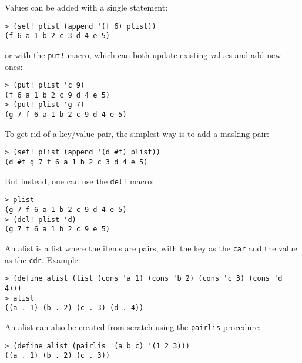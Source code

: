 \documentclass{report}
\begin{document}
{Values can be added with a single statement:

\noindent\makebox[\linewidth]{\rule{\linewidth}{0.4pt}}
\begin{lstlisting}
> (set! plist (append '(f 6) plist))
(f 6 a 1 b 2 c 3 d 4 e 5)
\end{lstlisting}
\noindent\makebox[\linewidth]{\rule{\linewidth}{0.4pt}}

or with the \texttt{put!} macro, which can both update existing values and add new ones:

\noindent\makebox[\linewidth]{\rule{\linewidth}{0.4pt}}
\begin{lstlisting}
> (put! plist 'c 9)
(f 6 a 1 b 2 c 9 d 4 e 5)
> (put! plist 'g 7)
(g 7 f 6 a 1 b 2 c 9 d 4 e 5)
\end{lstlisting}
\noindent\makebox[\linewidth]{\rule{\linewidth}{0.4pt}}

To get rid of a key/value pair, the simplest way is to add a masking pair:

\noindent\makebox[\linewidth]{\rule{\linewidth}{0.4pt}}
\begin{lstlisting}
> (set! plist (append '(d #f) plist))
(d #f g 7 f 6 a 1 b 2 c 3 d 4 e 5)
\end{lstlisting}
\noindent\makebox[\linewidth]{\rule{\linewidth}{0.4pt}}

But instead, one can use the \texttt{del!} macro:

\noindent\makebox[\linewidth]{\rule{\linewidth}{0.4pt}}
\begin{lstlisting}
> plist
(g 7 f 6 a 1 b 2 c 9 d 4 e 5)
> (del! plist 'd)
(g 7 f 6 a 1 b 2 c 9 e 5)
\end{lstlisting}
\noindent\makebox[\linewidth]{\rule{\linewidth}{0.4pt}}

An alist is a list where the items are pairs, with the key as the \texttt{car} and the value as the \texttt{cdr}. Example:

\noindent\makebox[\linewidth]{\rule{\linewidth}{0.4pt}}
\begin{lstlisting}
> (define alist (list (cons 'a 1) (cons 'b 2) (cons 'c 3) (cons 'd 4)))
> alist
((a . 1) (b . 2) (c . 3) (d . 4))
\end{lstlisting}
\noindent\makebox[\linewidth]{\rule{\linewidth}{0.4pt}}

An alist can also be created from scratch using the \texttt{pairlis} procedure:

\noindent\makebox[\linewidth]{\rule{\linewidth}{0.4pt}}
\begin{lstlisting}
> (define alist (pairlis '(a b c) '(1 2 3)))
((a . 1) (b . 2) (c . 3))
\end{lstlisting}
\noindent\makebox[\linewidth]{\rule{\linewidth}{0.4pt}}

}
\end{document}

